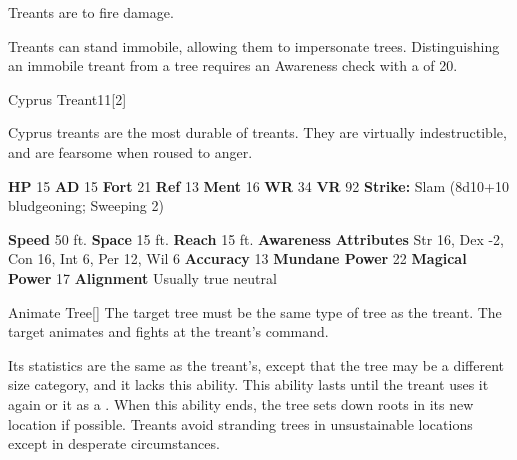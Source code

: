         Treants are  to fire damage.
      
        Treants can stand immobile, allowing them to impersonate trees.
        Distinguishing an immobile treant from a tree requires an Awareness check with a  of 20.
  

  \begin{monsubsection}{Cyprus Treant}{11}[2]
    \vspace{-1em}\vspace{-1em}
    \vspace{0em}

    
          Cyprus treants are the most durable of treants.
          They are virtually indestructible, and are fearsome when roused to anger.
        

    \begin{spellcontent}
      \begin{spelltargetinginfo}
        \pari \textbf{HP} 15 \monsep
          \textbf{AD} 15 \monsep
          \textbf{Fort} 21 \monsep
          \textbf{Ref} 13 \monsep
          \textbf{Ment} 16
        \pari \textbf{WR} 34 \monsep
        \textbf{VR} 92
        \pari \textbf{Strike:}
            Slam  (8d10+10 bludgeoning; Sweeping 2)
      \end{spelltargetinginfo}
    \end{spellcontent}
    \begin{monsterfooter}
      \pari \textbf{Speed} 50 ft. \monsep
        \textbf{Space} 15 ft. \monsep
        \textbf{Reach} 15 ft.
      \pari \textbf{Awareness} 
      \pari \textbf{Attributes}
        Str 16, Dex -2,
        Con 16, Int 6,
        Per 12, Wil 6
      \pari \textbf{Accuracy} 13 \monsep
        \textbf{Mundane Power} 22 \monsep
      \textbf{Magical Power} 17
      \pari \textbf{Alignment} Usually true neutral
    \end{monsterfooter}
  \end{monsubsection}
  \begin{freeability}{Animate Tree}[]
      The target tree must be the same type of tree as the treant.
        The target animates and fights at the treant's command.

        Its statistics are the same as the treant's, except that the tree may be a different size category, and it lacks this ability.
        This ability lasts until the treant uses it again or  it as a .
        When this ability ends, the tree sets down roots in its new location if possible.
        Treants avoid stranding trees in unsustainable locations except in desperate circumstances.
    \end{freeability}
  
